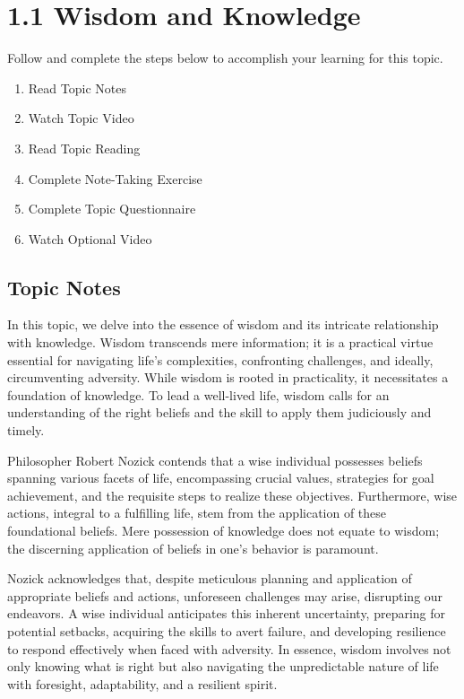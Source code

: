 \documentclass[
]{book}
\providecommand{\tightlist}{%
  \setlength{\itemsep}{0pt}\setlength{\parskip}{0pt}}
\begin{document}
\hypertarget{wisdom-and-knowledge}{%
\section*{1.1 Wisdom and Knowledge}\label{wisdom-and-knowledge}}

Follow and complete the steps below to accomplish your learning for this topic.

\begin{enumerate}
\def\labelenumi{\arabic{enumi}.}
\tightlist
\item
  Read Topic Notes
\item
  Watch Topic Video
\item
  Read Topic Reading
\item
  Complete Note-Taking Exercise
\item
  Complete Topic Questionnaire
\item
  Watch Optional Video
\end{enumerate}

\hypertarget{topic-notes}{%
\subsection*{Topic Notes}\label{topic-notes}}

In this topic, we delve into the essence of wisdom and its intricate relationship with knowledge. Wisdom transcends mere information; it is a practical virtue essential for navigating life's complexities, confronting challenges, and ideally, circumventing adversity. While wisdom is rooted in practicality, it necessitates a foundation of knowledge. To lead a well-lived life, wisdom calls for an understanding of the right beliefs and the skill to apply them judiciously and timely.

Philosopher Robert Nozick contends that a wise individual possesses beliefs spanning various facets of life, encompassing crucial values, strategies for goal achievement, and the requisite steps to realize these objectives. Furthermore, wise actions, integral to a fulfilling life, stem from the application of these foundational beliefs. Mere possession of knowledge does not equate to wisdom; the discerning application of beliefs in one's behavior is paramount.

Nozick acknowledges that, despite meticulous planning and application of appropriate beliefs and actions, unforeseen challenges may arise, disrupting our endeavors. A wise individual anticipates this inherent uncertainty, preparing for potential setbacks, acquiring the skills to avert failure, and developing resilience to respond effectively when faced with adversity. In essence, wisdom involves not only knowing what is right but also navigating the unpredictable nature of life with foresight, adaptability, and a resilient spirit.
\end{document}
